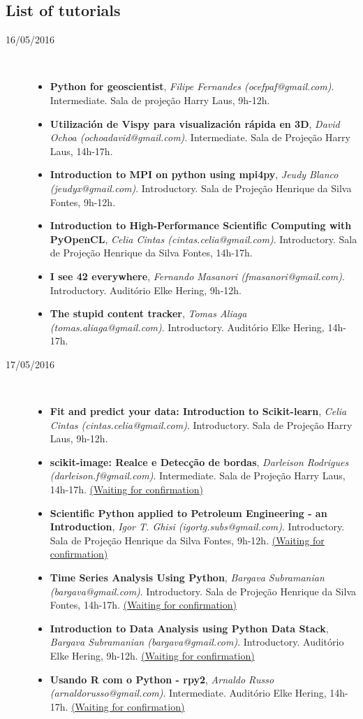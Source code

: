 \documentclass[12pt]{article}
\begin{document}
\subsection*{List of tutorials}
\begin{description}
   \item[16/05/2016] \ 
   \begin{itemize}
      \item \textbf{Python for geoscientist}, \emph{Filipe Fernandes (ocefpaf@gmail.com)}. Intermediate. Sala de projeção Harry Laus, 9h-12h.
      \item \textbf{Utilización de Vispy para visualización rápida en 3D}, \emph{David Ochoa (ochoadavid@gmail.com)}. Intermediate. Sala de Projeção Harry Laus, 14h-17h.
      \item \textbf{Introduction to MPI on python using mpi4py}, \emph{Jeudy Blanco (jeudyx@gmail.com)}. Introductory. Sala de Projeção Henrique da Silva Fontes, 9h-12h.
      \item \textbf{Introduction to High-Performance Scientific Computing with PyOpenCL}, \emph{Celia Cintas (cintas.celia@gmail.com)}. Introductory. Sala de Projeção Henrique da Silva Fontes, 14h-17h.
      \item \textbf{I see 42 everywhere}, \emph{Fernando Masanori (fmasanori@gmail.com)}. Introductory. Auditório Elke Hering, 9h-12h.
      \item \textbf{The stupid content tracker}, \emph{Tomas Aliaga (tomas.aliaga@gmail.com)}. Introductory. Auditório Elke Hering, 14h-17h.
   \end{itemize}
   \item[17/05/2016] \ 
   \begin{itemize}
      \item \textbf{Fit and predict your data: Introduction to Scikit-learn}, \emph{Celia Cintas (cintas.celia@gmail.com)}. Introductory. Sala de Projeção Harry Laus, 9h-12h.
      \item \textbf{scikit-image: Realce e Detecção de bordas}, \emph{Darleison Rodrigues (darleison.f@gmail.com)}. Intermediate. Sala de Projeção Harry Laus, 14h-17h. \underline{(Waiting for confirmation)}
      \item \textbf{Scientific Python applied to Petroleum Engineering - an Introduction}, \emph{Igor T. Ghisi (igortg.subs@gmail.com)}. Introductory. Sala de Projeção Henrique da Silva Fontes, 9h-12h. \underline{(Waiting for confirmation)} 
      \item \textbf{Time Series Analysis Using Python}, \emph{Bargava Subramanian (bargava@gmail.com)}. Introductory. Sala de Projeção Henrique da Silva Fontes, 14h-17h. \underline{(Waiting for confirmation)}
      \item \textbf{Introduction to Data Analysis using Python Data Stack}, \emph{Bargava Subramanian (bargava@gmail.com)}. Introductory. Auditório Elke Hering, 9h-12h. \underline{(Waiting for confirmation)}
    \item \textbf{Usando R com o Python - rpy2}, \emph{Arnaldo Russo (arnaldorusso@gmail.com)}. Intermediate. Auditório Elke Hering, 14h-17h. \underline{(Waiting for confirmation)}
   \end{itemize}
\end{description}

\newpage

\vspace*{1cm}
\end{document}
